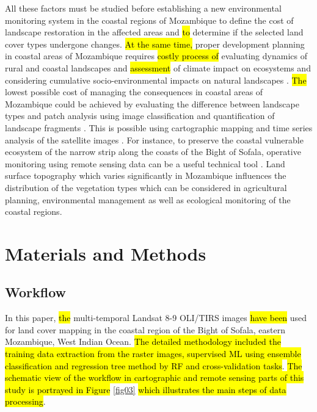 \documentclass[coasts,article,submit,pdftex,moreauthors]{Definitions/mdpi}
\begin{document}
All these factors must be studied before establishing a new environmental monitoring system in the coastal regions of Mozambique to define the cost of landscape restoration in the affected areas and \hl{to }determine if the selected land cover types undergone changes. \hl{At the same time, }proper development planning in coastal areas of Mozambique requires \hl{costly process of }evaluating dynamics of rural and coastal landscapes and \hl{assessment} of\hl{ }climate impact on ecosystems and considering cumulative socio-environmental impacts on natural landscapes \cite{SMITH2019101976,LUNDGREN2022103023,SILVA201843,MARTINS2022102793}.\hl{ The }lowest possible cost of managing the consequences in coastal areas of Mozambique could be achieved by evaluating the difference between\hl{ }landscape types and patch analysis using image classification and quantification of landscape fragments \cite{PITTMAN2023}. This is possible using cartographic mapping and time series analysis of the satellite images \cite{XI2019111212,ABIDI2023106152,MOHAMMADI2023272}. For instance, to preserve the coastal vulnerable ecosystem of the narrow strip along the coasts of the Bight of Sofala, operative monitoring using remote sensing data can be a useful technical tool \cite{NAMAGANDA2023117811}. Land surface topography which varies significantly in Mozambique influences the distribution of the vegetation types which can be considered in agricultural planning, environmental management as well as ecological monitoring of the coastal regions. 

\section{Materials and Methods}

\subsection{Workflow}
In this paper, \hl{the} multi-temporal Landsat 8-9 OLI/TIRS images \hl{have been} used for land cover mapping in the coastal region of the Bight of Sofala, eastern Mozambique, West Indian Ocean. \hl{The detailed methodology included the training data extraction from the raster images, supervised ML using ensemble classification and regression tree method by RF and cross-validation tasks}.  \hl{The schematic view of the workflow in cartographic and remote sensing parts of this study is portrayed in Figure} \ref{fig03} \hl{which illustrates the main steps of data processing}.
\end{document}
